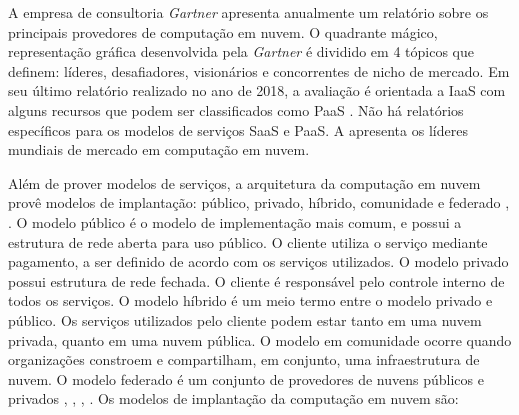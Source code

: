 A empresa de consultoria \textit{Gartner} apresenta anualmente um relatório sobre os principais provedores de computação em nuvem. O quadrante mágico, representação gráfica desenvolvida pela \textit{Gartner} é dividido em 4 tópicos que definem: líderes, desafiadores, visionários e concorrentes de nicho de mercado. Em seu último relatório realizado no ano de 2018, a avaliação é orientada a  \acrshort{IaaS} com alguns recursos que podem ser classificados como \acrshort{PaaS} \cite{Gartner2018}. Não há relatórios específicos para os modelos de serviços \acrshort{SaaS} e \acrshort{PaaS}. A  apresenta os líderes mundiais de mercado em computação em nuvem.


Além de prover modelos de serviços, a arquitetura da computação em nuvem provê modelos de implantação: público, privado, híbrido, comunidade e federado \cite{Buyya2009}, \cite{Buyya2010}. O modelo público é o modelo de implementação mais comum, e possui a estrutura de rede aberta para uso público. O cliente utiliza o serviço mediante pagamento, a ser definido de acordo com os serviços utilizados. O modelo privado possui estrutura de rede fechada. O cliente é responsável pelo controle interno de todos os serviços. O modelo híbrido é um meio termo entre o modelo privado e público. Os serviços utilizados pelo cliente podem estar tanto em uma nuvem privada, quanto em uma nuvem pública. O modelo em comunidade ocorre quando organizações constroem e compartilham, em conjunto, uma infraestrutura de nuvem. O modelo federado é um conjunto de provedores de nuvens públicos e privados \cite{Zhang2010}, \cite{Jadeja2012}, \cite{Puthal2015}, \cite{Buyya2010}. Os modelos de implantação da computação em nuvem são:

